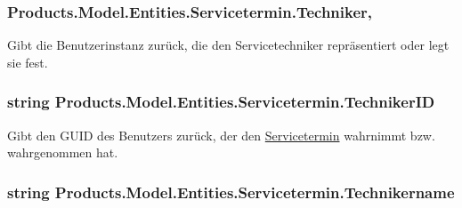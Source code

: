 \subsubsection[{\texorpdfstring{Techniker}{Techniker}}]{ Products.\+Model.\+Entities.\+Servicetermin.\+Techniker\hspace{0.3cm}{\ttfamily [get]}, {\ttfamily [set]}}\hypertarget{class_products_1_1_model_1_1_entities_1_1_servicetermin_a7d5e6be212ec17c3fc51af1efa4a92f0}{}\label{class_products_1_1_model_1_1_entities_1_1_servicetermin_a7d5e6be212ec17c3fc51af1efa4a92f0}


Gibt die Benutzerinstanz zurück, die den Servicetechniker repräsentiert oder legt sie fest. 

\subsubsection[{\texorpdfstring{Techniker\+ID}{TechnikerID}}]{\setlength{\rightskip}{0pt plus 5cm}string Products.\+Model.\+Entities.\+Servicetermin.\+Techniker\+ID\hspace{0.3cm}{\ttfamily [get]}}\hypertarget{class_products_1_1_model_1_1_entities_1_1_servicetermin_a3aef8cc3560b79d669f4b60e6b26fadf}{}\label{class_products_1_1_model_1_1_entities_1_1_servicetermin_a3aef8cc3560b79d669f4b60e6b26fadf}


Gibt den G\+U\+ID des Benutzers zurück, der den \hyperlink{class_products_1_1_model_1_1_entities_1_1_servicetermin}{Servicetermin} wahrnimmt bzw. wahrgenommen hat. 

\subsubsection[{\texorpdfstring{Technikername}{Technikername}}]{\setlength{\rightskip}{0pt plus 5cm}string Products.\+Model.\+Entities.\+Servicetermin.\+Technikername\hspace{0.3cm}{\ttfamily [get]}}\hypertarget{class_products_1_1_model_1_1_entities_1_1_servicetermin_a5e1b45561a89e8e0ab884b7ce2be39e0}{}\label{class_products_1_1_model_1_1_entities_1_1_servicetermin_a5e1b45561a89e8e0ab884b7ce2be39e0}


